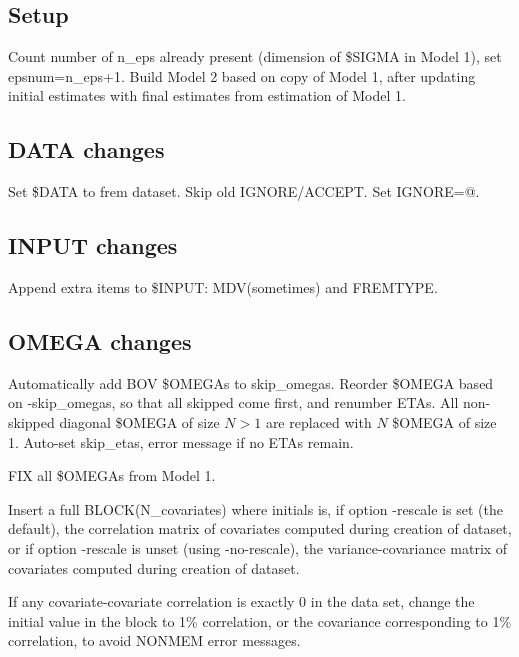 \subsection{Setup}
Count number of n\_eps already present (dimension of \$SIGMA in Model 1), set epsnum=n\_eps+1.
Build Model 2 based on copy of Model 1, after updating initial estimates with final estimates
from estimation of Model 1.

\subsection{DATA changes}
Set \$DATA to frem dataset. Skip old IGNORE/ACCEPT. Set IGNORE=@.

\subsection{INPUT changes}
Append extra items to \$INPUT: MDV(sometimes) and FREMTYPE.

\subsection{OMEGA changes}
Automatically add BOV \$OMEGAs to skip\_omegas.
Reorder \$OMEGA based on -skip\_omegas, so that all skipped come first, and renumber ETAs.
All non-skipped diagonal \$OMEGA of size $N>1$
are replaced with $N$ \$OMEGA of size 1.
Auto-set skip\_etas, error message if no ETAs remain.

FIX all \$OMEGAs from Model 1.

Insert
a full BLOCK(N\_covariates) where initials is,
if option -rescale is set (the default), the correlation matrix of covariates computed during
creation of dataset, or if option -rescale is unset (using -no-rescale),
the variance-covariance matrix of covariates computed during creation of dataset.

If any covariate-covariate correlation is exactly 0 in the data set, change the initial
value in the block to 1\% correlation, or the covariance corresponding to 1\% correlation,
to avoid NONMEM error messages.


